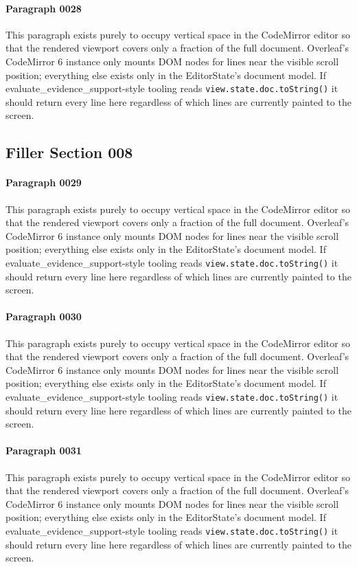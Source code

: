 \documentclass{article}
\begin{document}
\paragraph{Paragraph 0028}
This paragraph exists purely to occupy vertical space in the CodeMirror editor so that the rendered viewport covers only a fraction of the full document. Overleaf's CodeMirror 6 instance only mounts DOM nodes for lines near the visible scroll position; everything else exists only in the EditorState's document model. If evaluate\_evidence\_support-style tooling reads \texttt{view.state.doc.toString()} it should return every line here regardless of which lines are currently painted to the screen.

\subsection{Filler Section 008}
\paragraph{Paragraph 0029}
This paragraph exists purely to occupy vertical space in the CodeMirror editor so that the rendered viewport covers only a fraction of the full document. Overleaf's CodeMirror 6 instance only mounts DOM nodes for lines near the visible scroll position; everything else exists only in the EditorState's document model. If evaluate\_evidence\_support-style tooling reads \texttt{view.state.doc.toString()} it should return every line here regardless of which lines are currently painted to the screen.

\paragraph{Paragraph 0030}
This paragraph exists purely to occupy vertical space in the CodeMirror editor so that the rendered viewport covers only a fraction of the full document. Overleaf's CodeMirror 6 instance only mounts DOM nodes for lines near the visible scroll position; everything else exists only in the EditorState's document model. If evaluate\_evidence\_support-style tooling reads \texttt{view.state.doc.toString()} it should return every line here regardless of which lines are currently painted to the screen.

\paragraph{Paragraph 0031}
This paragraph exists purely to occupy vertical space in the CodeMirror editor so that the rendered viewport covers only a fraction of the full document. Overleaf's CodeMirror 6 instance only mounts DOM nodes for lines near the visible scroll position; everything else exists only in the EditorState's document model. If evaluate\_evidence\_support-style tooling reads \texttt{view.state.doc.toString()} it should return every line here regardless of which lines are currently painted to the screen.
\end{document}
